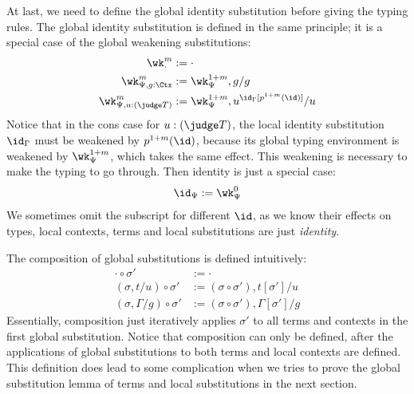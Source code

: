 At last, we need to define the global identity substitution before giving the typing
rules. %
The global identity substitution is defined in the same principle; it is a special
case of the global weakening substitutions:
\begin{align*}
  \wk^m_{\cdot} &:=  \cdot \\
  \wk^m_{\Psi, g : \Ctx} &:=  \wk_{\Psi}^{1+m}, g/g \\
  \wk^m_{\Psi, u : (\judge T)} &:= \wk^{1 + m}_{\Psi}, u^{\id_\Gamma[p^{1+m}(\id)]}/u
\end{align*}
Notice that in the cons case for $u : (\judge T)$, the local identity substitution
$\id_{\Gamma}$ must be weakened by $p^{1+m}(\id)$, because its global typing
environment is weakened by $\wk^{1 + m}_{\Psi}$, which takes the same effect. %
This weakening is necessary to make the typing to go through. %
Then identity is just a special case:
\begin{align*}
  \id_{\Psi} := \wk^0_{\Psi}
\end{align*}
We sometimes omit the subscript for different $\id$, as we know their effects on
types, local contexts, terms and local substitutions are just \emph{identity}. 

The composition of global substitutions is defined intuitively:
\begin{align*}
  \cdot \circ \sigma' &:= \cdot \\
  (\sigma, t/u) \circ \sigma' &:= (\sigma \circ \sigma'), t[\sigma']/u \\
  (\sigma, \Gamma/g) \circ \sigma' &:= (\sigma \circ \sigma'), \Gamma[\sigma']/g
\end{align*}
Essentially, composition just iteratively applies $\sigma'$ to all terms and contexts
in the first global substitution. %
Notice that composition can only be defined, after the applications of global
substitutions to both terms and local contexts are defined. %
This definition does lead to some complication when we tries to prove the global
substitution lemma of terms and local substitutions in the next section. %

